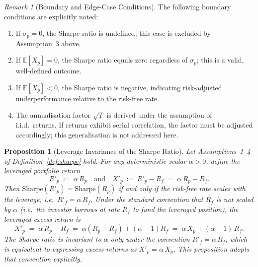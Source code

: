 \documentclass[12pt,openany]{book}
\newcommand{\E}{\mathbb{E}}
\numberwithin{equation}{chapter}
\theoremstyle{plain}
\newtheorem{proposition}[theorem]{Proposition}
\theoremstyle{definition}
\theoremstyle{remark}
\newtheorem{remark}[theorem]{Remark}
\numberwithin{equation}{chapter}
\theoremstyle{plain}
\begin{document}
\begin{remark}[Boundary and Edge-Case Conditions]
\label{rem:sharpe-edge}
The following boundary conditions are explicitly noted:
\begin{enumerate}
  \item If $\sigma_p = 0$, the Sharpe ratio is undefined; this
        case is excluded by Assumption~3 above.
  \item If $\E[X_p] = 0$, the Sharpe ratio equals zero regardless
        of $\sigma_p$; this is a valid, well-defined outcome.
  \item If $\E[X_p] < 0$, the Sharpe ratio is negative, indicating
        risk-adjusted underperformance relative to the risk-free rate.
  \item The annualisation factor $\sqrt{T}$ is derived under the
        assumption of i.i.d.\ returns.  If returns exhibit serial
        correlation, the factor must be adjusted accordingly; this
        generalisation is not addressed here.
\end{enumerate}
\end{remark}

\begin{proposition}[Leverage Invariance of the Sharpe Ratio]
\label{prop:sharpe-leverage}
Let Assumptions~1--4 of Definition~\ref{def:sharpe} hold.
For any deterministic scalar $\alpha > 0$, define the
leveraged portfolio return
\begin{equation}
  R'_p \;\coloneqq\; \alpha\,R_p
  \quad\text{and}\quad
  X'_p \;\coloneqq\; R'_p - R_f \;=\; \alpha\,R_p - R_f.
\end{equation}
Then $\mathrm{Sharpe}(R'_p) = \mathrm{Sharpe}(R_p)$ if and only if
the risk-free rate scales with the leverage, i.e.\
$R'_f = \alpha\,R_f$.  Under the standard convention that
$R_f$ is not scaled by $\alpha$ (i.e.\ the investor borrows at
rate $R_f$ to fund the leveraged position), the leveraged excess
return is
\begin{equation}
  X'_p \;=\; \alpha\,R_p - R_f
         \;=\; \alpha(R_p - R_f) + (\alpha - 1)R_f
         \;=\; \alpha\,X_p + (\alpha-1)\,R_f.
\end{equation}
The Sharpe ratio is invariant to $\alpha$ only under the
convention $R'_f = \alpha\,R_f$, which is equivalent to
expressing excess returns as $X'_p = \alpha\,X_p$.
This proposition adopts that convention explicitly.
\end{proposition}
\end{document}
